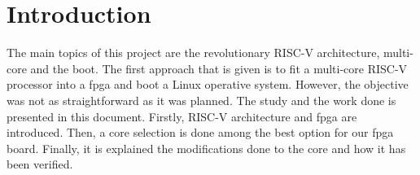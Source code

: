 \section{Introduction}
The main topics of this project are the revolutionary RISC-V architecture, multi-core and the boot. The first approach that is given is to 
fit a multi-core RISC-V processor into a \gls{fpga} and boot a Linux operative system. However, the objective was not as straightforward as it was planned. The study and the work done is presented in this document. Firstly, RISC-V architecture and \gls{fpga} are introduced. Then, a core selection is done among the best option for our \gls{fpga} board. Finally, it is explained the modifications done to the core and how it has been verified. 
